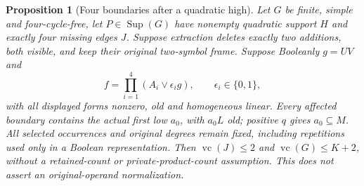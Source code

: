 \documentclass[11pt]{article}
\newcommand{\Sup}{\operatorname{Sup}}
\newcommand{\vc}{\operatorname{vc}}
\newtheorem{proposition}[theorem]{Proposition}
\theoremstyle{definition}
\theoremstyle{remark}
\begin{document}
\begin{proposition}[Four boundaries after a quadratic high]\label{prop:quadraticfourboundary}
Let $G$ be finite, simple and four-cycle-free, let $P\in\Sup(G)$ have nonempty quadratic support $H$ and exactly four missing edges $J$. Suppose extraction deletes exactly two additions, both visible, and keep their original two-symbol frame. Suppose Booleanly $g=UV$ and
\[
 f=\prod_{i=1}^4(A_i\vee\epsilon_i g),\qquad \epsilon_i\in\{0,1\},
\]
with all displayed forms nonzero, old and homogeneous linear. Every affected boundary contains the actual first low $a_0$, with $a_0L$ old; positive $q$ gives $a_0\subseteq M$. All selected occurrences and original degrees remain fixed, including repetitions used only in a Boolean representation. Then $\vc(J)\le2$ and $\vc(G)\le K+2$, without a retained-count or private-product-count assumption. This does not assert an original-operand normalization.
\end{proposition}
\end{document}
